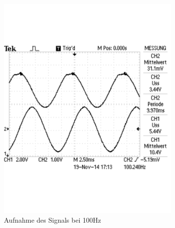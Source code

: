 \documentclass[12pt,a4paper]{article}
\begin{document}
\begin{figure}[H]
        \centering
        \begin{subfigure}[b]{0.28\textwidth}
                \includegraphics[width=\textwidth , scale = 0.4]{2_6_sin_100.pdf}
                \caption[Aufnahme des Signals bei 100Hz]{Aufnahme des Signals bei 100Hz}
                \label{fig:2_6_sin_100}
        \end{subfigure}%
        \hfill
        \begin{subfigure}[b]{0.28\textwidth}

\end{subfigure}
\end{figure}
\end{document}
